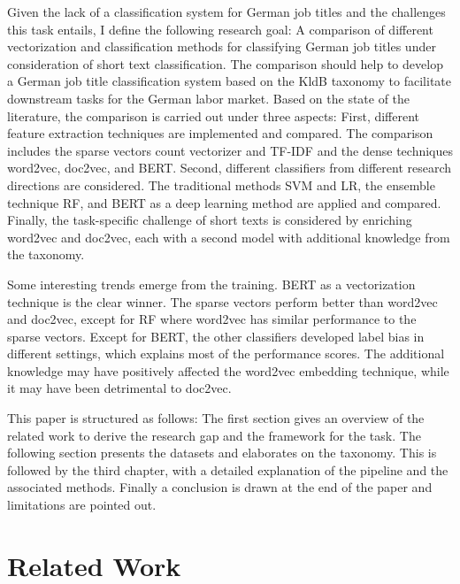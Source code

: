 \documentclass[12pt, a4paper, titlepage]{article}
\begin{document}
Given the lack of a classification system for German job titles and the challenges this task entails, I define the following research goal: A comparison of different vectorization and classification methods for classifying German job titles under consideration of short text classification. The comparison should help to develop a German job title classification system based on the \ac{KldB} taxonomy to facilitate downstream tasks for the German labor market. Based on the state of the literature, the comparison is carried out under three aspects: First, different feature extraction techniques are implemented and compared. The comparison includes the sparse vectors count vectorizer and \ac{TF-IDF} and the dense techniques word2vec, doc2vec, and \ac{BERT}. Second, different classifiers from different research directions are considered. The traditional methods SVM and LR, the ensemble technique RF, and \ac{BERT} as a deep learning method are applied and compared. Finally, the task-specific challenge of short texts is considered by enriching word2vec and doc2vec, each with a second model with additional knowledge from the taxonomy. 

Some interesting trends emerge from the training. \ac{BERT} as a vectorization technique is the clear winner. The sparse vectors perform better than word2vec and doc2vec, except for \ac{RF} where word2vec has similar performance to the sparse vectors. Except for \ac{BERT}, the other classifiers developed label bias in different settings, which explains most of the performance scores. The additional knowledge may have positively affected the word2vec embedding technique, while it may have been detrimental to doc2vec. 

This paper is structured as follows: The first section gives an overview of the related work to derive the research gap and the framework for the task. The following section presents the datasets and elaborates on the taxonomy. This is followed by the third chapter, with a detailed explanation of the pipeline and the associated methods. Finally a conclusion is drawn at the end of the paper and limitations are pointed out. 

\section{Related Work}
\end{document}
